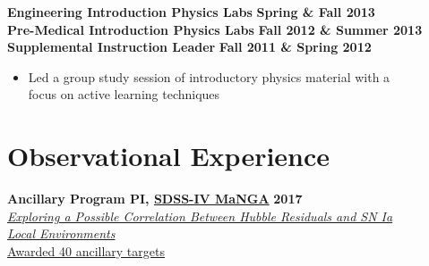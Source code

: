 \documentclass[margin]{res}
\begin{document}
\begin{resume}
\textbf{Engineering Introduction Physics Labs} \hfill{} \textbf{Spring \& Fall 2013}\\
\textbf{Pre-Medical Introduction Physics Labs} \hfill{} \textbf{Fall 2012 \& Summer 2013}\\
{\bf Supplemental Instruction Leader} \hfill{} \textbf{Fall 2011 \& Spring 2012}
    \begin{itemize}\itemsep -2pt
    \item[] Led a group study session of introductory physics material with a \\focus on active learning techniques
    \end{itemize}

\begin{comment}
year |   Fall        | Spring        | Summer
1st  | Labs-premed   | labs-eng      | labs-premed
2nd  | Labs-eng      | RA            | RA
3rd  | RA/IntroAstro | Peter's intro | RA
4th  | IntroAstro    | Python        | RA
5th  | Physics C HW  | RA            | RA & REU classes
6th  | Fellowship (GRE Class) | Python | NA!?!
\end{comment}








\section{Observational Experience}

{\bf Ancillary Program PI, \href{http://www.sdss.org/dr13/manga/}{SDSS-IV MaNGA}} \hfill \textbf{2017} \\
\href{https://trac.sdss.org/wiki/MANGA/Survey/AncillaryPrograms2017/Rose_SNIa_Environments_and_HR}{\textit{Exploring a Possible Correlation Between Hubble Residuals and SN Ia \\Local Environments}}\\
\href{http://www.sdss.org/dr14/manga/manga-target-selection/ancillary-targets/}{Awarded 40 ancillary targets}


\end{resume}
\end{document}

